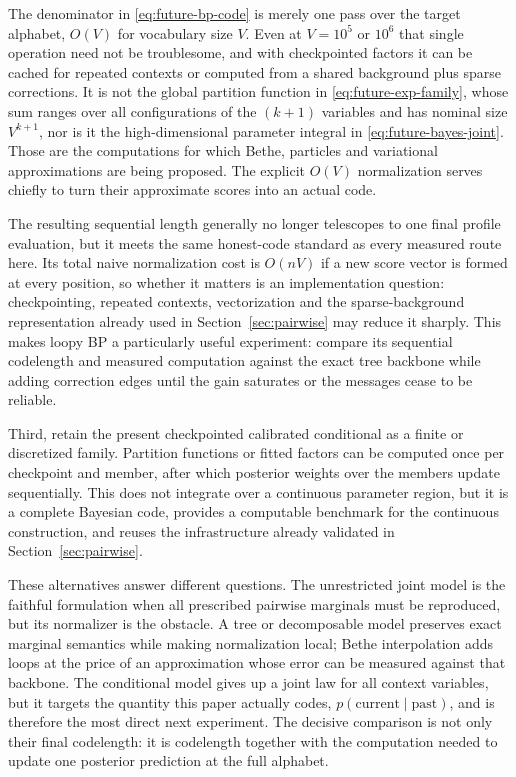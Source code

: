 \documentclass[11pt]{article}
\begin{document}
The denominator in \eqref{eq:future-bp-code} is merely one pass over
the target alphabet, $O(V)$ for vocabulary size $V$.  Even at
$V=10^5$ or $10^6$ that single operation need not be troublesome, and
with checkpointed factors it can be cached for repeated contexts or
computed from a shared background plus sparse corrections.  It is not
the global partition function in \eqref{eq:future-exp-family}, whose
sum ranges over all configurations of the $(k+1)$ variables and has
nominal size $V^{k+1}$, nor is it the high-dimensional parameter
integral in \eqref{eq:future-bayes-joint}.  Those are the computations
for which Bethe, particles and variational approximations are being
proposed.  The explicit $O(V)$ normalization serves chiefly to turn
their approximate scores into an actual code.

The resulting sequential length generally no longer telescopes to one
final profile evaluation, but it meets the same honest-code standard
as every measured route here.  Its total naive normalization cost is
$O(nV)$ if a new score vector is formed at every position, so whether
it matters is an implementation question: checkpointing, repeated
contexts, vectorization and the sparse-background representation
already used in Section~\ref{sec:pairwise} may reduce it sharply.
This makes loopy BP a particularly useful experiment: compare its
sequential codelength and measured computation against the exact tree
backbone while adding correction edges until the gain saturates or the
messages cease to be reliable.

Third, retain the present checkpointed calibrated conditional as a
finite or discretized family.  Partition functions or fitted factors
can be computed once per checkpoint and member, after which posterior
weights over the members update sequentially.  This does not integrate
over a continuous parameter region, but it is a complete Bayesian code,
provides a computable benchmark for the continuous construction, and
reuses the infrastructure already validated in
Section~\ref{sec:pairwise}.

These alternatives answer different questions.  The unrestricted
joint model is the faithful formulation when all prescribed pairwise
marginals must be reproduced, but its normalizer is the obstacle.  A
tree or decomposable model preserves exact marginal semantics while
making normalization local; Bethe interpolation adds loops at the
price of an approximation whose error can be measured against that
backbone.  The conditional model gives up a joint law for all context
variables, but it targets the quantity this paper actually codes,
$p(\text{current}\mid\text{past})$, and is therefore the most direct
next experiment.  The decisive comparison is not only their final
codelength: it is codelength together with the computation needed to
update one posterior prediction at the full alphabet.
\end{document}
